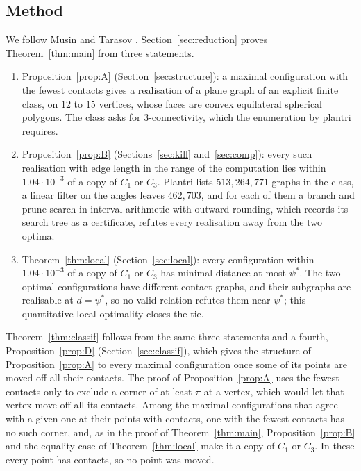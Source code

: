 \documentclass[12pt]{amsart}
\theoremstyle{definition}
\theoremstyle{plain}
\theoremstyle{definition}
\newcommand{\psis}{\psi^{*}}
\newcommand{\CI}{C_1}
\newcommand{\CIII}{C_3}
\begin{document}
\subsection*{Method}
We follow Musin and Tarasov \cite{MT13,MT14}. Section~\ref{sec:reduction} proves Theorem~\ref{thm:main} from three statements.
\begin{enumerate}
\item Proposition~\ref{prop:A} (Section~\ref{sec:structure}): a maximal configuration with the fewest contacts gives a realisation of a plane graph of an explicit finite class, on $12$ to $15$ vertices, whose faces are convex equilateral spherical polygons. The class asks for 3-connectivity, which the enumeration by plantri \cite{BM} requires.
\item Proposition~\ref{prop:B} (Sections~\ref{sec:kill} and~\ref{sec:comp}): every such realisation with edge length in the range of the computation lies within $1.04\cdot10^{-3}$ of a copy of $\CI$ or $\CIII$. Plantri lists $513{,}264{,}771$ graphs in the class, a linear filter on the angles leaves $462{,}703$, and for each of them a branch and prune search in interval arithmetic with outward rounding, which records its search tree as a certificate, refutes every realisation away from the two optima.
\item Theorem~\ref{thm:local} (Section~\ref{sec:local}): every configuration within $1.04\cdot10^{-3}$ of a copy of $\CI$ or $\CIII$ has minimal distance at most $\psis$. The two optimal configurations have different contact graphs, and their subgraphs are realisable at $d=\psis$, so no valid relation refutes them near $\psis$; this quantitative local optimality closes the tie.
\end{enumerate}
Theorem~\ref{thm:classif} follows from the same three statements and a fourth, Proposition~\ref{prop:D} (Section~\ref{sec:classif}), which gives the structure of Proposition~\ref{prop:A} to every maximal configuration once some of its points are moved off all their contacts. The proof of Proposition~\ref{prop:A} uses the fewest contacts only to exclude a corner of at least $\pi$ at a vertex, which would let that vertex move off all its contacts. Among the maximal configurations that agree with a given one at their points with contacts, one with the fewest contacts has no such corner, and, as in the proof of Theorem~\ref{thm:main}, Proposition~\ref{prop:B} and the equality case of Theorem~\ref{thm:local} make it a copy of $\CI$ or $\CIII$. In these every point has contacts, so no point was moved.
\end{document}
